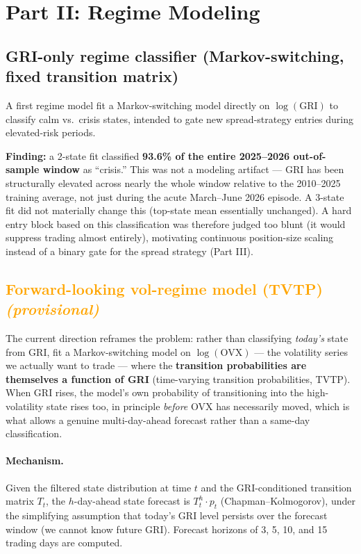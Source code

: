 \documentclass[11pt]{article}
\newcommand{\provisional}[1]{\textcolor{orange}{#1 \textit{(provisional)}}}
\begin{document}
\section{Part II: Regime Modeling}

\subsection{GRI-only regime classifier (Markov-switching, fixed transition matrix)}
A first regime model fit a Markov-switching model directly on
$\log(\text{GRI})$ to classify calm vs.\ crisis states, intended to gate new
spread-strategy entries during elevated-risk periods.

\textbf{Finding:} a 2-state fit classified \textbf{93.6\% of the entire
2025--2026 out-of-sample window} as ``crisis.'' This was not a modeling
artifact --- GRI has been structurally elevated across nearly the whole
window relative to the 2010--2025 training average, not just during the
acute March--June 2026 episode. A 3-state fit did not materially change
this (top-state mean essentially unchanged). A hard entry block based on
this classification was therefore judged too blunt (it would suppress
trading almost entirely), motivating continuous position-size scaling
instead of a binary gate for the spread strategy (Part III).

\subsection{\provisional{Forward-looking vol-regime model (TVTP)}}
The current direction reframes the problem: rather than classifying
\emph{today's} state from GRI, fit a Markov-switching model on
$\log(\text{OVX})$ --- the volatility series we actually want to trade ---
where the \textbf{transition probabilities are themselves a function of
GRI} (time-varying transition probabilities, TVTP). When GRI rises, the
model's own probability of transitioning into the high-volatility state
rises too, in principle \emph{before} OVX has necessarily moved, which is
what allows a genuine multi-day-ahead forecast rather than a same-day
classification.

\paragraph{Mechanism.} Given the filtered state distribution at time $t$ and
the GRI-conditioned transition matrix $T_t$, the $h$-day-ahead state
forecast is $T_t^h \cdot p_t$ (Chapman--Kolmogorov), under the simplifying
assumption that today's GRI level persists over the forecast window (we
cannot know future GRI). Forecast horizons of 3, 5, 10, and 15 trading days
are computed.
\end{document}
